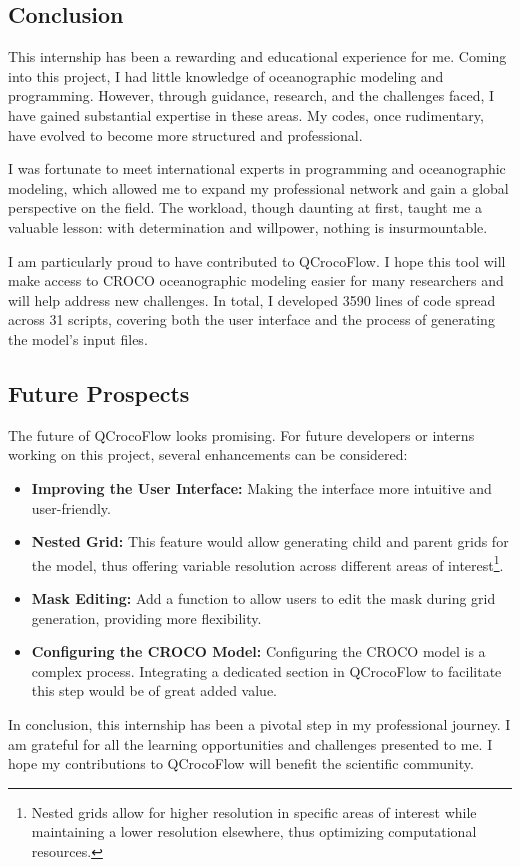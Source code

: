 \subsection{Conclusion}
This internship has been a rewarding and educational experience for me. Coming into this project, I had little knowledge of oceanographic modeling and programming. However, through guidance, research, and the challenges faced, I have gained substantial expertise in these areas. My codes, once rudimentary, have evolved to become more structured and professional.

I was fortunate to meet international experts in programming and oceanographic modeling, which allowed me to expand my professional network and gain a global perspective on the field. The workload, though daunting at first, taught me a valuable lesson: with determination and willpower, nothing is insurmountable.

I am particularly proud to have contributed to QCrocoFlow. I hope this tool will make access to CROCO oceanographic modeling easier for many researchers and will help address new challenges. In total, I developed 3590 lines of code spread across 31 scripts, covering both the user interface and the process of generating the model's input files.

\subsection{Future Prospects}

The future of QCrocoFlow looks promising. For future developers or interns working on this project, several enhancements can be considered:

\begin{itemize}
	\item \textbf{Improving the User Interface:} Making the interface more intuitive and user-friendly.
	\item \textbf{Nested Grid:} This feature would allow generating child and parent grids for the model, thus offering variable resolution across different areas of interest\footnote{Nested grids allow for higher resolution in specific areas of interest while maintaining a lower resolution elsewhere, thus optimizing computational resources.}.
	\item \textbf{Mask Editing:} Add a function to allow users to edit the mask during grid generation, providing more flexibility.
	\item \textbf{Configuring the CROCO Model:} Configuring the CROCO model is a complex process. Integrating a dedicated section in QCrocoFlow to facilitate this step would be of great added value.\\
\end{itemize}

In conclusion, this internship has been a pivotal step in my professional journey. I am grateful for all the learning opportunities and challenges presented to me. I hope my contributions to QCrocoFlow will benefit the scientific community.


